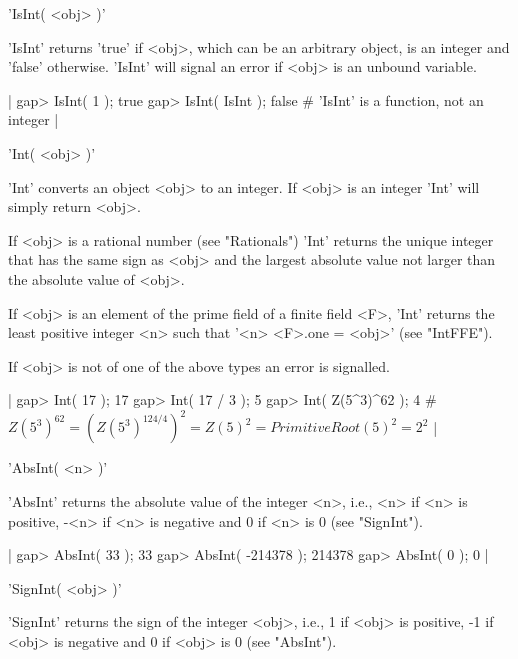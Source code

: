 %

'IsInt( <obj> )'

'IsInt' returns 'true' if <obj>, which can be an  arbitrary object, is an
integer and 'false' otherwise.  'IsInt' will signal an error if  <obj> is
an unbound variable.

|    gap> IsInt( 1 );
    true
    gap> IsInt( IsInt );
    false        # 'IsInt' is a function, not an integer |

%

'Int( <obj> )'

'Int' converts an  object <obj> to an  integer.   If <obj> is an  integer
'Int' will simply return <obj>.

If <obj> is a rational number (see "Rationals")  'Int' returns the unique
integer that has  the same sign  as  <obj> and the largest absolute value
not larger than the absolute value of <obj>.

If <obj> is an element  of the prime field  of a finite field <F>,  'Int'
returns the least positive integer <n> such that '<n>\*  <F>.one = <obj>'
(see "IntFFE").

If <obj> is not of one of the above types an error is signalled.

|    gap> Int( 17 );
    17
    gap> Int( 17 / 3 );
    5
    gap> Int( Z(5^3)^62 );
    4  # $Z(5^3)^{62}=(Z(5^3)^{124/4})^2=Z(5)^2=PrimitiveRoot(5)^2=2^2$ |

%

'AbsInt( <n> )'

'AbsInt' returns the absolute value of the integer <n>,  i.e., <n> if <n>
is positive, -<n> if <n> is negative and 0 if <n> is 0 (see "SignInt").

|    gap> AbsInt( 33 );
    33
    gap> AbsInt( -214378 );
    214378
    gap> AbsInt( 0 );
    0 |

%

'SignInt( <obj> )'

'SignInt' returns  the  sign of the integer  <obj>, i.e.,  1 if <obj>  is
positive, -1 if <obj> is negative and 0 if <obj> is 0 (see "AbsInt").

